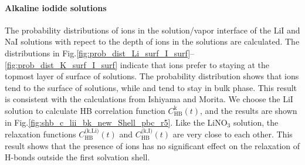 \paragraph{Alkaline iodide solutions}
The probability distributions of ions in the solution/vapor interface of the LiI and NaI solutions with repect to the depth 
of ions in the solutions %
are calculated. 
The distributions in Fig.\thinspace\ref{fig:prob_dist_Li_surf_I_surf}--\ref{fig:prob_dist_K_surf_I_surf} indicate
that \I ions prefer to staying at the topmost layer of surface of solutions.
The probability distribution shows that \I ions tend to the surface of solutions, while \Na and \Li tend to stay in bulk phase. 
This result is consistent with the calculations from Ishiyama and Morita\cite{TI07,Ishiyama2014}.
We choose the LiI solution to calculate HB correlation function $C^\text{k}_\text{HB}(t)$,
and the results are shown in Fig.\ref{fig:shb_c_lii_bk_new_Shell_pbc_r5}. 
Like the LiNO$_3$ solution, the relaxation functions $C^\text{(k,Li)}_\text{HB}(t)$ and 
$C^\text{(k,I)}_\text{HB}(t)$ are very close to each other. 
This result shows that the presence of ions has no significant effect on the relaxation of H-bonds outside the first solvation shell.

